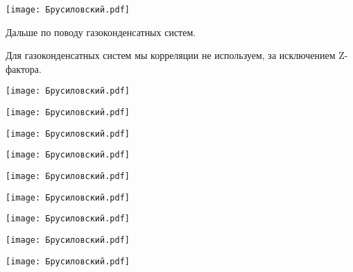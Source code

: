 \documentclass[main.tex]{subfiles}
\begin{document}
\begin{center}
\texttt{[image: Брусиловский.pdf]}
\end{center}

Дальше по поводу газоконденсатных систем.

Для газоконденсатных систем мы корреляции не используем, за исключением Z-фактора.

\begin{center}
\texttt{[image: Брусиловский.pdf]}
\end{center}



\begin{center}
\texttt{[image: Брусиловский.pdf]}
\end{center}



\begin{center}
\texttt{[image: Брусиловский.pdf]}
\end{center}



\begin{center}
\texttt{[image: Брусиловский.pdf]}
\end{center}



\begin{center}
\texttt{[image: Брусиловский.pdf]}
\end{center}



\begin{center}
\texttt{[image: Брусиловский.pdf]}
\end{center}



\begin{center}
\texttt{[image: Брусиловский.pdf]}
\end{center}



\begin{center}
\texttt{[image: Брусиловский.pdf]}
\end{center}



\begin{center}
\texttt{[image: Брусиловский.pdf]}
\end{center}
\end{document}
